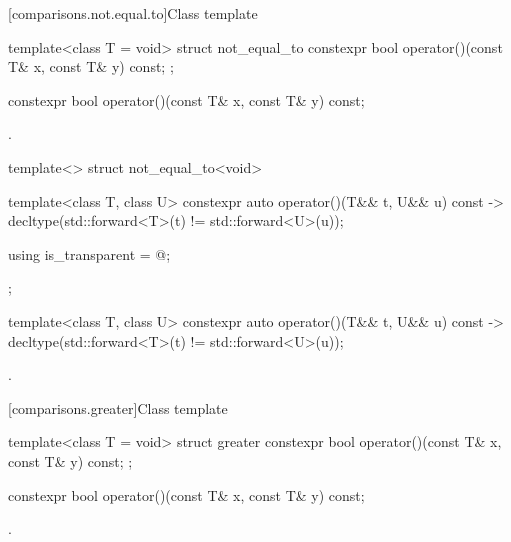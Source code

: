 [comparisons.not.equal.to]{Class template }

%
\begin{itemdecl}
template<class T = void> struct not_equal_to {
  constexpr bool operator()(const T& x, const T& y) const;
};
\end{itemdecl}

%
\begin{itemdecl}
constexpr bool operator()(const T& x, const T& y) const;
\end{itemdecl}

\begin{itemdescr}
\pnum
\returns
{}.
\end{itemdescr}

%
\begin{itemdecl}
template<> struct not_equal_to<void> {
  template<class T, class U> constexpr auto operator()(T&& t, U&& u) const
    -> decltype(std::forward<T>(t) != std::forward<U>(u));

  using is_transparent = @\unspec@;
};
\end{itemdecl}

%
\begin{itemdecl}
template<class T, class U> constexpr auto operator()(T&& t, U&& u) const
    -> decltype(std::forward<T>(t) != std::forward<U>(u));
\end{itemdecl}

\begin{itemdescr}
\pnum
\returns
{}.
\end{itemdescr}

[comparisons.greater]{Class template }

%
\begin{itemdecl}
template<class T = void> struct greater {
  constexpr bool operator()(const T& x, const T& y) const;
};
\end{itemdecl}

%
\begin{itemdecl}
constexpr bool operator()(const T& x, const T& y) const;
\end{itemdecl}

\begin{itemdescr}
\pnum
\returns
{}.
\end{itemdescr}

